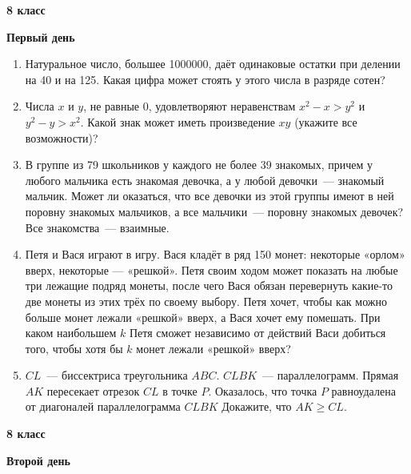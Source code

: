 \documentclass{article}
\begin{document}
    \large

    \begin{center}
        \LARGE\textbf{8 класс}
    \end{center}
    \begin{center}
        \large\textbf{Первый день}
    \end{center}


    \begin{enumerate}[label*=8.{\arabic{enumi}}]

        \item Натуральное число, большее 1000000, даёт одинаковые остатки при делении на 40 и на 125.
        Какая цифра может стоять у этого числа в разряде сотен?

        \item Числа $x$ и $y$, не равные 0, удовлетворяют неравенствам $x^2-x > y^2$ и $y^2-y > x^2$.
        Какой знак может иметь произведение $xy$ (укажите все возможности)?

        \item В группе из 79 школьников у каждого не более 39 знакомых, причем у любого мальчика есть знакомая девочка, а у любой девочки~--- знакомый мальчик.
        Может ли оказаться, что все девочки из этой группы имеют в ней поровну знакомых мальчиков, а все мальчики~--- поровну знакомых девочек?
        Все знакомства~--- взаимные.

        \item Петя и Вася играют в игру.
        Вася кладёт в ряд 150 монет: некоторые «орлом» вверх, некоторые — «решкой».
        Петя своим ходом может показать на любые три лежащие подряд монеты, после чего Вася обязан перевернуть какие-то две монеты из этих трёх по своему выбору.
        Петя хочет, чтобы как можно больше монет лежали «решкой» вверх, а Вася хочет ему помешать.
        При каком наибольшем $k$ Петя сможет независимо от действий Васи добиться того, чтобы хотя бы $k$ монет лежали «решкой» вверх?
        \item $CL$~--- биссектриса треугольника $ABC$. $CLBK$~--- параллелограмм.
        Прямая $AK$ пересекает отрезок $CL$ в точке $P$.
        Оказалось, что точка $P$ равноудалена от диагоналей параллелограмма $CLBK$ Докажите, что $AK \geqslant CL$.


    \end{enumerate}

    \newpage

    \begin{center}
        \LARGE\textbf{8 класс}
    \end{center}
    \begin{center}
        \large\textbf{Второй день}
    \end{center}
\end{document}
